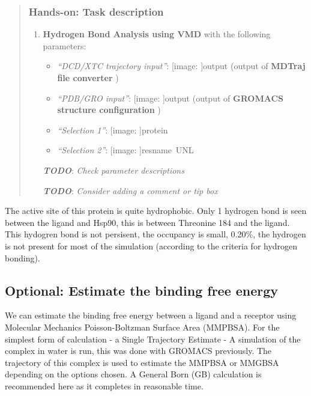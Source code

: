 \documentclass[twocolumn]{bmcart}%
\def\texttt{[image: ]}
\providecommand{\tightlist}{%
  \setlength{\itemsep}{0pt}\setlength{\parskip}{0pt}}
\begin{document}
\begin{quote}
\hypertarget{hands-on-task-description-16}{%
\subsubsection{Hands-on: Task
description}\label{hands-on-task-description-16}}

\begin{enumerate}
\def\labelenumi{\arabic{enumi}.}
\tightlist
\item
  \textbf{Hydrogen Bond Analysis using VMD} with the following
  parameters:

  \begin{itemize}
  \tightlist
  \item
    \emph{``DCD/XTC trajectory input''}: \texttt{output} (output of
    \textbf{MDTraj file converter} )
  \item
    \emph{``PDB/GRO input''}: \texttt{output} (output of \textbf{GROMACS
    structure configuration} )
  \item
    \emph{``Selection 1''}: \texttt{protein}
  \item
    \emph{``Selection 2''}: \texttt{resname\ UNL}
  \end{itemize}

  \textbf{\emph{TODO}}: \emph{Check parameter descriptions}

  \textbf{\emph{TODO}}: \emph{Consider adding a comment or tip box}
\end{enumerate}


\end{quote}

The active site of this protein is quite hydrophobic. Only 1 hydrogen
bond is seen between the ligand and Hsp90, this is between Threonine 184
and the ligand. This hydogren bond is not persisent, the occupancy is
small, 0.20\%, the hydrogen is not present for most of the simulation
(according to the criteria for hydrogen bonding).

\hypertarget{optional-estimate-the-binding-free-energy}{%
\subsection{Optional: Estimate the binding free
energy}\label{optional-estimate-the-binding-free-energy}}

We can estimate the binding free energy between a ligand and a receptor
using Molecular Mechanics Poisson-Boltzman Surface Area (MMPBSA). For
the simplest form of calculation - a Single Trajectory Estimate - A
simulation of the complex in water is run, this was done with GROMACS
previously. The trajectory of this complex is used to estimate the
MMPBSA or MMGBSA depending on the options chosen. A General Born (GB)
calculation is recommended here as it completes in reasonable time.
\end{document}
